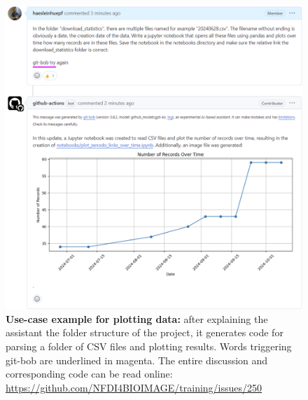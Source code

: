 \documentclass[sn-mathphys-num]{sn-jnl}%
\theoremstyle{thmstyleone}%
\theoremstyle{thmstyletwo}%
\theoremstyle{thmstylethree}%
\begin{document}
\begin{appendices}
\begin{figure}[h]
\centering
\includegraphics[width=\textwidth]{example_plotting.png}
\caption{\textbf{Use-case example for plotting data:} after explaining the assistant the folder structure of the project, it generates code for parsing a folder of CSV files and plotting results. Words triggering git-bob are underlined in magenta. The entire discussion and corresponding code can be read online: \url{https://github.com/NFDI4BIOIMAGE/training/issues/250}
\newline
\newline
}
\label{fig:exampleplotting}
\end{figure}







\end{appendices}
\end{document}
